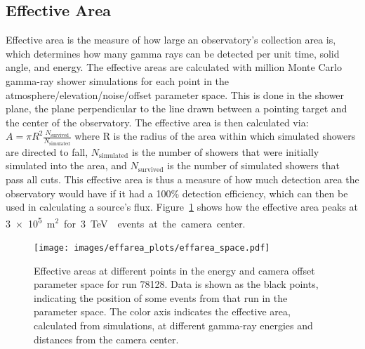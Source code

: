 \subsection{Effective Area}\label{subsec:effarea}
Effective area is the measure of how large an observatory's collection area is, which determines how many gamma rays can be detected per unit time, solid angle, and energy.
The effective areas are calculated with  million Monte Carlo gamma-ray shower simulations for each point in the atmosphere/elevation/noise/offset parameter space.
This is done in the shower plane, the plane perpendicular to the line drawn between a pointing target and the center of the observatory.
The effective area is then calculated via:
$A=\pi R^2 \frac{N_{\text{survived}}}{N_{\text{simulated}}}$
where R is the radius of the area within which simulated showers are directed to fall, $N_{\text{simulated}}$ is the number of showers that were initially simulated into the area, and $N_{\text{survived}}$ is the number of simulated showers that pass all cuts.
This effective area is thus a measure of how much detection area the observatory would have if it had a 100\% detection efficiency, which can then be used in calculating a source's flux.
Figure~\ref{fig:effarea_paramspace} shows how the effective area peaks at \nicetilde{}\SI{3e5}{m${}^2$} for \SI{3}{\TeV{}} events at the camera center.

\begin{figure}[!t]
  \centering
  \texttt{[image: images/effarea\_plots/effarea\_space.pdf]}
  \caption[Effective Area Parameter Space]{
    Effective areas at different points in the energy and camera offset parameter space for run 78128.
    Data is shown as the black points, indicating the position of some events from that run in the parameter space.
    The color axis indicates the effective area, calculated from simulations, at different gamma-ray energies and distances from the camera center.
  }
  \label{fig:effarea_paramspace}
\end{figure}

